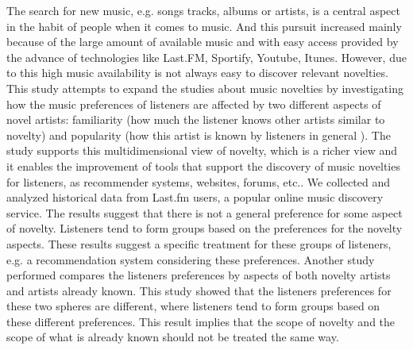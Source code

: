 The search for new music, e.g. songs tracks, albums or artists, is a central aspect in the habit of people when it comes to music. And this pursuit increased mainly because of the large amount of  available music and with easy access provided by the advance of technologies like Last.FM, Sportify, Youtube, Itunes. However, due to this high music availability is not always easy to discover relevant novelties. This study attempts to expand the studies about music novelties by investigating how the music preferences of listeners are affected by two different aspects of novel artists: familiarity (how much the listener knows other artists similar to novelty) and popularity (how this artist is known by listeners in general ). The study supports this multidimensional view of novelty, which is a richer view and it enables the improvement of tools that support the discovery of music novelties for listeners, as recommender systems,  websites, forums, etc.. 
We collected and analyzed historical data from Last.fm users, a popular online music discovery service. The results suggest that there is not a general preference for some aspect of novelty. Listeners tend to form groups based on the preferences for the novelty aspects. These results suggest a specific treatment for these groups of listeners, e.g. a recommendation system considering these preferences. Another study performed  compares the listeners preferences by aspects of both novelty artists and artists already known. This study showed that the listeners preferences for these two spheres are different, where listeners tend to form groups based on these different preferences. This result implies that the scope of novelty and the scope of what is already known should not be treated the same way.